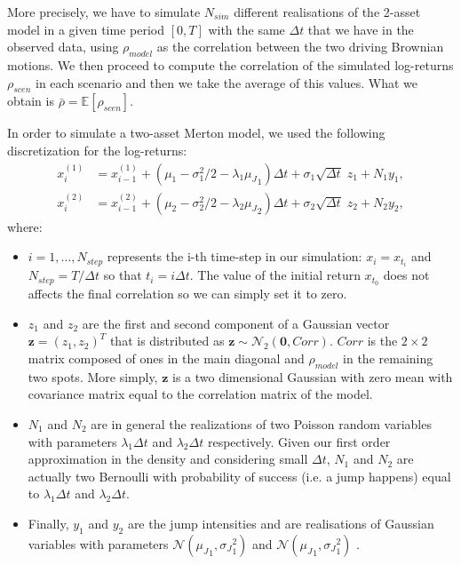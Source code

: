 More precisely, we have to simulate $N_{sim}$ different realisations of the 2-asset model in a given time period $[0, T]$ with the same $\Delta t$ that we have in the observed data, using $\rho_{model}$ as the correlation between the two driving Brownian motions. We then proceed to compute the correlation of the simulated log-returns $\rho_{scen}$ in each scenario and then we take the average of this values. What we obtain is $\bar{\rho} = \mathbb{E}[\rho_{scen}] $.

In order to simulate a two-asset Merton model, we used the following discretization for the log-returns:
\begin{subequations}
	\label{eq:merton_discretization}
	\begin{align}
	x_i^{(1)} &= x_{i-1}^{(1)} + (\mu_1 - \sigma_1^2/2 -\lambda_1 {\mu_J}_1) \Delta t + \sigma_1 \sqrt{\Delta t} \;  z_1 + N_1 {y}_1 ,\\
	x_i^{(2)} &= x_{i-1}^{(2)} + (\mu_2 - \sigma_2^2/2 -\lambda_2 {\mu_J}_2) \Delta t + \sigma_2 \sqrt{\Delta t} \; z_2 + N_2 {y}_2 ,
	\end{align}
\end{subequations} 
where:
\begin{itemize}
	\item $i = 1, \dots , N_{step}$ represents the i-th time-step in our simulation: $x_i = x_{t_i}$ and $N_{step} = T / \Delta t$ so that $t_i = i \Delta t$. The value of the initial return $x_{t_0}$ does not affects the final correlation so we can simply set it to zero.
	\item $z_1$ and $z_2$ are the first and second component of a Gaussian vector $\mathbf{z} = (z_1,z_2)^T$ that is distributed as $\mathbf{z} \sim \mathcal{N}_2(\mathbf{0}, Corr)$. $Corr$ is the $2 \times 2$ matrix composed of ones in the main diagonal and $\rho_{model}$ in the remaining two spots. 
	More simply, $\mathbf{z}$ is a two dimensional Gaussian with zero mean with covariance matrix equal to the correlation matrix of the model.
	\item $N_1$ and $N_2$ are in general the realizations of two Poisson random variables with parameters $\lambda_1 \Delta t$ and $\lambda_2 \Delta t$ respectively. Given our first order approximation in the density and considering small $\Delta t$,  $N_1$ and $N_2$ are actually two Bernoulli with probability of success (i.e. a jump happens) equal to $\lambda_1 \Delta t$ and $\lambda_2 \Delta t$.
	\item Finally, $y_1$ and $y_2$ are the jump intensities and are realisations of Gaussian variables with parameters $\mathcal{N}({\mu_J}_1, {\sigma_J}_1^2)$ and $\mathcal{N}({\mu_J}_1, {\sigma_J}_1^2)$ . 
\end{itemize}

